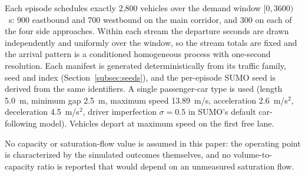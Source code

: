 \documentclass[review,12pt]{elsarticle}
\begin{document}
Each episode schedules exactly 2{,}800 vehicles over the demand window
$[0,3600)$~s: 900 eastbound and 700 westbound on the main corridor, and
300 on each of the four side approaches. Within each stream the
departure seconds are drawn independently and uniformly over the
window, so the stream totals are fixed and the arrival pattern is a
conditioned homogeneous process with one-second resolution. Each
manifest is generated deterministically from its traffic family, seed
and index (Section~\ref{subsec:seeds}), and the per-episode SUMO seed is
derived from the same identifiers. A single passenger-car type is used
(length 5.0~m, minimum gap 2.5~m, maximum speed 13.89~m/s,
acceleration 2.6~m/s$^2$, deceleration 4.5~m/s$^2$, driver imperfection
$\sigma=0.5$ in SUMO's default car-following model).
Vehicles depart at maximum speed on the first free lane.

No capacity or saturation-flow value is assumed in this paper: the
operating point is characterized by the simulated outcomes themselves,
and no volume-to-capacity ratio is reported that would depend on an
unmeasured saturation flow.
\end{document}
